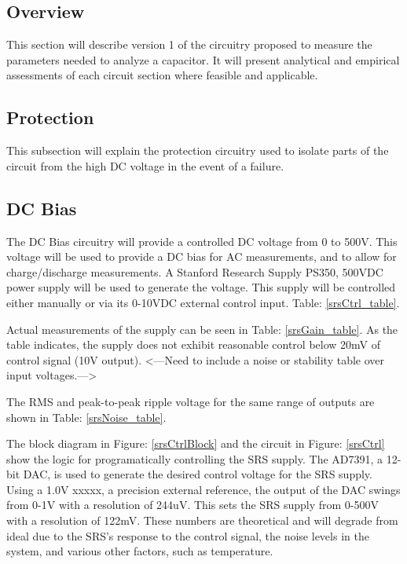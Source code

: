 
\subsection {Overview}

This section will describe version 1 of the circuitry proposed to measure the parameters needed to analyze a capacitor. It will present analytical and empirical assessments of each circuit section where feasible and applicable.

\subsection {Protection}

This subsection will explain the protection circuitry used to isolate parts of the circuit from the high DC voltage in the event of a failure.

\subsection {DC Bias}

The DC Bias circuitry will provide a controlled DC voltage from 0 to 500V. This voltage will be used to provide a DC bias for AC measurements, and to allow for charge/discharge measurements. A Stanford Research Supply PS350, 500VDC power supply will be used to generate the voltage. This supply will be controlled either manually or via its 0-10VDC external control input. Table: \ref{srsCtrl_table}. 



Actual measurements of the supply can be seen in Table: \ref{srsGain_table}. As the table indicates, the supply does not exhibit reasonable control below 20mV of control signal (10V output). <---Need to include a noise or stability table over input voltages.--->



The RMS and peak-to-peak ripple voltage for the same range of outputs are shown in Table: \ref{srsNoise_table}.





The block diagram in Figure: \ref{srsCtrlBlock} and the circuit in Figure: \ref{srsCtrl} show the logic for programatically controlling the SRS supply. The AD7391, a 12-bit DAC, is used to generate the desired control voltage for the SRS supply. Using a 1.0V xxxxx, a precision external reference, the output of the DAC swings from 0-1V with a resolution of 244uV. This sets the SRS supply from 0-500V with a resolution of 122mV. These numbers are theoretical and will degrade from ideal due to the SRS's response to the control signal, the noise levels in the system, and various other factors, such as temperature.

